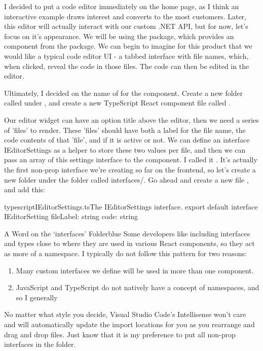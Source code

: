 \documentclass[paper=6in:9in,pagesize=pdftex,headinclude=on,footinclude=on,12pt]{scrbook}
\begin{document}
I decided to put a code editor immediately on the home page, as I think an interactive example draws interest and converts to the most customers. Later, this editor will actually interact with our custom .NET API, but for now, let's focus on it's appearance. We will be using the  package, which provides an  component from the  package. We can begin to imagine for this product that we would like a typical code editor UI - a tabbed interface with file names, which, when clicked, reveal the code in those files. The code can then be edited in the editor.

Ultimately, I decided on the name of  for the component. Create a new folder called  under , and create a new TypeScript React component file called . 


Our editor widget can have an option title above the editor, then we need a series of 'files' to render. These 'files' should have both a label for the file name, the code contents of that 'file', and if it is active or not. We can define an interface IEditorSettings as a helper to store these two values per file, and then we can pass an array of this settings interface to the  component. I called it . It's actually the first non-prop interface we're creating so far on the frontend, so let's create a new folder under the  folder called {interfaces/}. Go ahead and create a new file , and add this:

\begin{codeInput}{typescript}{IEditorSettings.ts}{The IEditorSettings interface.}
export default interface IEditorSetting {
  fileLabel: string
  code: string
}  
\end{codeInput}

\begin{highlightBox}{A Word on the `interfaces' Folder}{blue}{\information}
Some developers like including interfaces and types close to where they are used in various React components, so they act as more of a namespace. I typically do not follow this pattern for two reasons:

\begin{enumerate}
  \item Many custom interfaces we define will be used in more than one component.
  \item JavaScript and TypeScript do not natively have a concept of namespaces, and so I generally 
\end{enumerate}

No matter what style you decide, Visual Studio Code's Intellisense won't care and will automatically update the import locations for you as you rearrange and drag and drop files. Just know that it is my preference to put all non-prop interfaces in the  folder.
\end{highlightBox}
\end{document}

